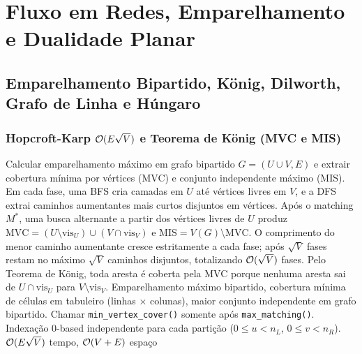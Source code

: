 \section{Fluxo em Redes, Emparelhamento e Dualidade Planar}

\subsection{Emparelhamento Bipartido, König, Dilworth, Grafo de Linha e Húngaro}

\subsubsection{Hopcroft-Karp $\mathcal{O}(E\sqrt{V})$ e Teorema de König (MVC e MIS)}
\algobox
  {Calcular emparelhamento máximo em grafo bipartido $G = (U \cup V, E)$ e extrair cobertura mínima por vértices (MVC) e conjunto independente máximo (MIS).}
  {Em cada fase, uma BFS cria camadas em $U$ até vértices livres em $V$, e a DFS extrai caminhos aumentantes mais curtos disjuntos em vértices. Após o matching $M^*$, uma busca alternante a partir dos vértices livres de $U$ produz $\text{MVC} = (U \setminus \text{vis}_U) \cup (V \cap \text{vis}_V)$ e $\text{MIS} = V(G) \setminus \text{MVC}$.}
  {O comprimento do menor caminho aumentante cresce estritamente a cada fase; após $\sqrt{V}$ fases restam no máximo $\sqrt{V}$ caminhos disjuntos, totalizando $\mathcal{O}(\sqrt{V})$ fases. Pelo Teorema de König, toda aresta é coberta pela MVC porque nenhuma aresta sai de $U \cap \text{vis}_U$ para $V \setminus \text{vis}_V$.}
  {Emparelhamento máximo bipartido, cobertura mínima de células em tabuleiro (linhas $\times$ colunas), maior conjunto independente em grafo bipartido.}
  {Chamar \texttt{min\_vertex\_cover()} somente após \texttt{max\_matching()}. Indexação 0-based independente para cada partição ($0 \le u < n_L$, $0 \le v < n_R$).}
  {$\mathcal{O}(E\sqrt{V})$ tempo, $\mathcal{O}(V + E)$ espaço}

